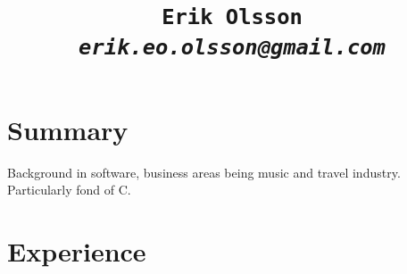 \documentclass[letterpaper]{scrartcl}
\begin{document}
\title{\vspace{-6ex}\tt{Erik Olsson\\\textit{erik.eo.olsson@gmail.com}}}

%
%



%
%

\section*{Summary}
\begin{list1}
  \item Background in software, business areas being music and travel industry. Particularly fond of C.
\end{list1}

\section*{Experience}
\end{document}
